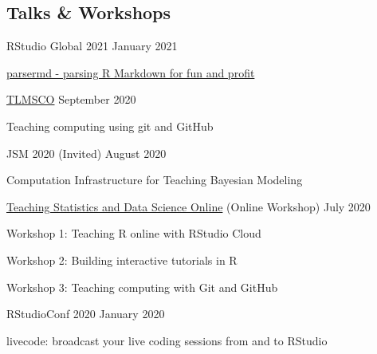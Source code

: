 \documentclass[margin,line]{res}
\begin{document}
\begin{resume}
\vspace{4mm}

%

\section{\sc Talks \& Workshops}

RStudio Global 2021 \hfill January 2021
\begin{list1}
\item[] \href{https://www.rstudio.com/resources/rstudioglobal-2021/parsermd-parsing-r-markdown-for-fun-and-profit/}{parsermd - parsing R Markdown for fun and profit}
\end{list1}
\vspace{-3mm}

\href{https://sites.google.com/view/rssteachingstatisticssig/research-meetings/teaching-and-learning-of-maths-and-stats-computing-online}{TLMSCO} \hfill September 2020
\begin{list1}
\item[] Teaching computing using git and GitHub
\end{list1}
\vspace{-3mm}

\pagebreak

JSM 2020 (Invited) \hfill August 2020
\begin{list1}
\item[] Computation Infrastructure for Teaching Bayesian Modeling
\end{list1}
\vspace{-3mm}

\href{http://bit.ly/teach-r-online-mats}{Teaching Statistics and Data Science Online} (Online Workshop) \hfill July 2020
\begin{list1}
\item[] Workshop 1: Teaching R online with RStudio Cloud
\item[] Workshop 2: Building interactive tutorials in R
\item[] Workshop 3: Teaching computing with Git and GitHub
\end{list1} 
\vspace{-3mm}




RStudioConf 2020 \hfill January 2020
\begin{list1}
\item[] livecode: broadcast your live coding sessions from and to RStudio
\end{list1}
\vspace{-3mm}


\end{resume}
\end{document}
